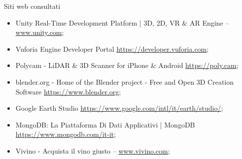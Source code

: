 \cleardoublepage
{}
{}
\nocite{*}


%

\vspace{2.5cm}
\begin{Large}Siti web consultati\end{Large}
\begin{itemize}
    \item Unity Real-Time Development Platform | 3D, 2D, VR \& AR Engine -- \url{www.unity.com};
    \item Vuforia Engine Developer Portal \url{https://developer.vuforia.com};
    \item Polycam - LiDAR \& 3D Scanner for iPhone \& Android \url{https://poly.cam};
    \item blender.org - Home of the Blender project - Free and Open 3D Creation Software \url{https://www.blender.org};
    \item Google Earth Studio \url{https://www.google.com/intl/it/earth/studio/};
    \item MongoDB: La Piattaforma Di Dati Applicativi | MongoDB \url{https://www.mongodb.com/it-it};
    \item Vivino - Acquista il vino giusto -- \url{www.vivino.com};
\end{itemize}

